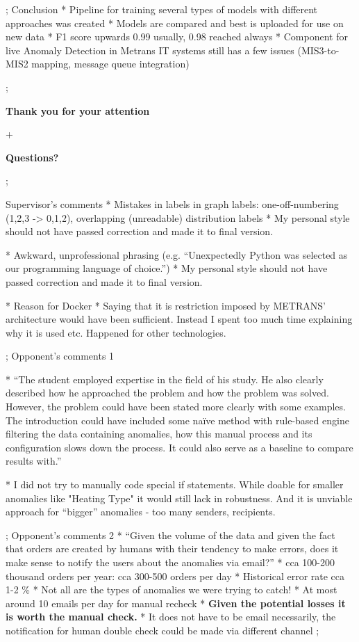 \pg;
\sec Conclusion
* Pipeline for training several types of models with different approaches was created
* Models are compared and best is uploaded for use on new data
* F1 score upwards 0.99 usually, 0.98 reached always
* Component for live Anomaly Detection in Metrans IT systems still has a few issues (MIS3-to-MIS2 mapping, message queue integration)

\pg;

\null
\vskip2cm
\centerline{\typosize[35/40]\bf Thank you for your attention}\pg+

\vskip2cm
\centerline{\Blue\typosize[60/70]\bf Questions?}

\pg;

\sec Supervisor's comments
* Mistakes in labels in graph labels: one-off-numbering (1,2,3 -> 0,1,2), overlapping (unreadable) distribution labels
\begitems
* My personal style should not have passed correction and made it to final version.
\enditems


* Awkward, unprofessional phrasing (e.g. “Unexpectedly Python was selected as our programming language of choice.”)
\begitems
* My personal style should not have passed correction and made it to final version.
\enditems

* Reason for Docker
\begitems
* Saying that it is restriction imposed by METRANS' architecture would have been sufficient. Instead I spent too much time explaining why it is used etc. Happened for other technologies.
\enditems

\pg;
\sec Opponent's comments 1

* “The student employed expertise in the field of his study. He also clearly described how he approached the problem and how the problem was solved. However, the problem could have been stated more clearly with some examples. The introduction could have included some naïve method with rule-based engine filtering the data containing anomalies, how this manual process and its configuration slows down the process. It could also serve as a baseline to compare results with.”

\begitems
* I did not try to manually code special if statements. While doable for smaller anomalies like "Heating Type" it would still lack in robustness. And it is unviable approach for “bigger” anomalies - too many senders, recipients.
\enditems

\pg;
\sec Opponent's comments 2
* “Given the volume of the data and given the fact that orders are created by humans with their tendency to make errors, does it make sense to notify the users about the anomalies via email?”
\begitems
* cca 100-200 thousand orders per year: cca 300-500 orders per day
* Historical error rate cca 1-2 \%
* Not all are the types of anomalies we were trying to catch!
* At most around 10 emails per day for manual recheck
* {\bf Given the potential losses it is worth the manual check.}
* It does not have to be email necessarily, the notification for human double check could be made via different channel
\enditems
\pg;

